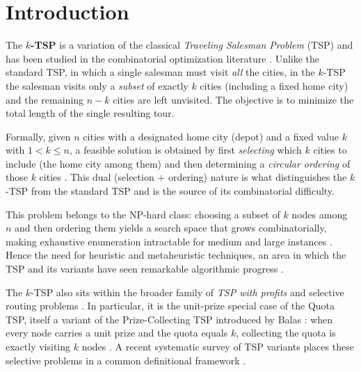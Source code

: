 \documentclass[conference]{IEEEtran}
\begin{document}
\section{Introduction}

The \textbf{$k$-TSP} is a variation of the classical \textit{Traveling Salesman Problem} (TSP) and has been studied in the combinatorial optimization literature \cite{venkatesh2018,pandiri2020,ene2017,blanchard2023}. Unlike the standard TSP, in which a single salesman must visit \emph{all} the cities, in the $k$-TSP the salesman visits only a \emph{subset} of exactly $k$ cities (including a fixed home city) and the remaining $n-k$ cities are left unvisited. The objective is to minimize the total length of the single resulting tour.

\vspace{2pt}
Formally, given $n$ cities with a designated home city (depot) and a fixed value $k$ with $1 < k \le n$, a feasible solution is obtained by first \emph{selecting} which $k$ cities to include (the home city among them) and then determining a \emph{circular ordering} of those $k$ cities \cite{venkatesh2018}. This dual (selection $+$ ordering) nature is what distinguishes the $k$-TSP from the standard TSP and is the source of its combinatorial difficulty.

\vspace{2pt}
This problem belongs to the NP-hard class: choosing a subset of $k$ nodes among $n$ and then ordering them yields a search space that grows combinatorially, making exhaustive enumeration intractable for medium and large instances \cite{lawler1985}. Hence the need for heuristic and metaheuristic techniques, an area in which the TSP and its variants have seen remarkable algorithmic progress \cite{rego2011tsp}.

\vspace{2pt}
The $k$-TSP also sits within the broader family of \emph{TSP with profits} and selective routing problems \cite{feillet2005profits}. In particular, it is the unit-prize special case of the Quota TSP, itself a variant of the Prize-Collecting TSP introduced by Balas \cite{balas1989pctsp}: when every node carries a unit prize and the quota equals $k$, collecting the quota is exactly visiting $k$ nodes \cite{bienstock1993pctsp}. A recent systematic survey of TSP variants places these selective problems in a common definitional framework \cite{tspt3co2025}.
\end{document}

